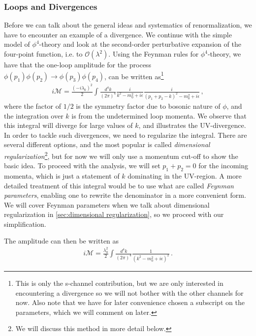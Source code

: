 \subsubsection*{Loops and Divergences}
Before we can talk about the general ideas and systematics of renormalization, we have to encounter an example of a divergence. We continue with the simple model of $\phi^{4}$-theory and look at the second-order perturbative expansion of the four-point function, i.e. to $\mathcal{O}(\lambda^{2})$. Using the Feynman rules for $\phi^{4}$-theory, we have that the one-loop amplitude for the process $\phi(p_1)\phi(p_2)\rightarrow\phi(p_3)\phi(p_4)$, can be written as\footnote{This is only the s-channel contribution, but we are only interested in encountering a divergence so we will not bother with the other channels for now. Also note that we have for later convenience chosen a subscript on the parameters, which we will comment on later.}
\begin{align}\label{eq:general one-loop amplitude in phi-4}
    i\mathcal{M}=\frac{(-i\lambda_{0})^{2}}{2}\int\frac{d^{4}k}{(2\pi)^{4}}\frac{i}{k^{2}-m_{0}^{2}+i\epsilon}\frac{i}{(p_1+p_2-k)^{2}-m_{0}^{2}+i\epsilon}\,,
\end{align}
where the factor of $1/2$ is the symmetry factor due to bosonic nature of $\phi$, and the integration over $k$ is from the undetermined loop momenta. We observe that this integral will diverge for large values of $k$, and illustrates the UV-divergence. In order to tackle such divergences, we need to regularize the integral. There are several different options, and the most popular is called \emph{dimensional regularization}\footnote{We will discuss this method in more detail below.}, but for now we will only use a momentum cut-off to show the basic idea. To proceed with the analysis, we will set $p_1+p_2=0$ for the incoming momenta, which is just a statement of $k$ dominating in the UV-region. A more detailed treatment of this integral would be to use what are called \emph{Feynman parameters}, enabling one to rewrite the denominator in a more convenient form. We will cover Feynman parameters when we talk about dimensional regularization in \cref{sec:dimensional regularization}, so we proceed with our simplification. 

The amplitude can then be written as
\begin{align}\label{eq:loop amplitude phi-4}
    i\mathcal{M}=\frac{\lambda_{0}^{2}}{2}\int\frac{d^{4}k}{(2\pi)^{4}}\frac{1}{(k^{2}-m_{0}^{2}+i\epsilon)^{2}}\,.
\end{align}


